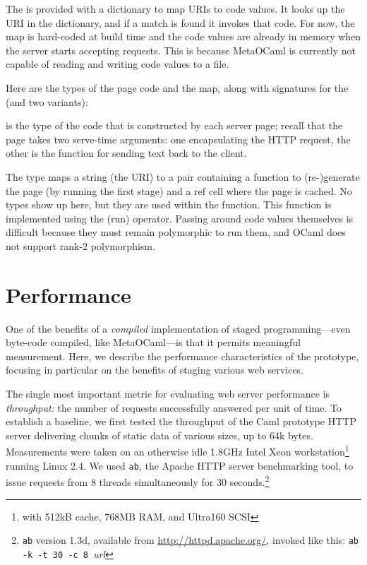 \documentclass[preprint]{acm_proc_article-sp}
\def\MOC{MetaOCaml\xspace}
\begin{document}
The  is provided with a dictionary to map URIs to code
values.  It looks up the URI in the dictionary, and if a match is
found it invokes that code.  For now, the map is hard-coded at build
time and the code values are already in memory when the server starts
accepting requests.  This is because \MOC is currently not capable of
reading and writing code values to a file.

Here are the types of the page code and the map, along with signatures
for the  (and two variants):

 is the type of the code that is constructed by each server
page; recall that the page takes two serve-time arguments: one
encapsulating the HTTP request, the other is the  function
for sending text back to the client.

The  type maps a string (the URI) to a pair containing a
function to (re-)generate the page (by running the first stage) and a
ref cell where the page is cached.  No  types show up here,
but they are used within the  function.  This
function is implemented using the \Mrun{} (run) operator.  Passing
around code values themselves is difficult because they must remain
polymorphic to run them, and OCaml does not support rank-2
polymorphism.


\section{Performance}
\label{sec:perf}
One of the benefits of a \emph{compiled} implementation of staged
programming---even byte-code compiled, like \MOC---is that it permits
meaningful measurement.  Here, we describe the performance
characteristics of the prototype, focusing in particular on the
benefits of staging various web services.

The single most important metric for evaluating web server performance
is \textit{throughput:} the number of requests successfully answered
per unit of time.  To establish a baseline, we first tested the
throughput of the Caml prototype HTTP server delivering chunks of
static data of various sizes, up to 64k bytes.
Measurements were taken on an otherwise idle 1.8GHz Intel
Xeon\texttrademark{} workstation\footnote{with 512kB cache, 768MB RAM,
  and Ultra160 SCSI} running Linux 2.4.  We used \texttt{ab},
the Apache HTTP server benchmarking tool, to issue requests
from 8 threads simultaneously for 30 seconds.\footnote{\texttt{ab}
  version 1.3d, available from \url{http://httpd.apache.org/}, 
  invoked like this:
  \texttt{ab -k -t 30 -c 8 }\textit{url}}
\end{document}

